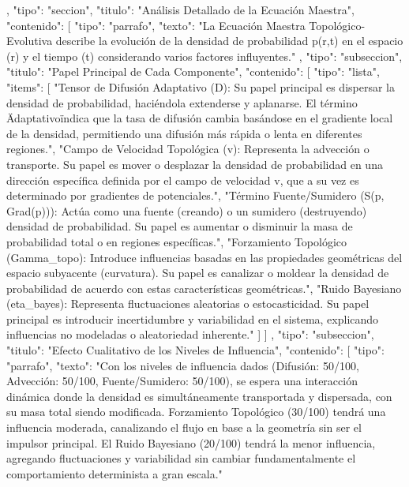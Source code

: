 \documentclass{article}
\begin{document}
{{    },
    {
      "tipo": "seccion",
      "titulo": "Análisis Detallado de la Ecuación Maestra",
      "contenido": [
        {
          "tipo": "parrafo",
          "texto": "La Ecuación Maestra Topológico-Evolutiva describe la evolución de la densidad de probabilidad p(r,t) en el espacio (r) y el tiempo (t) considerando varios factores influyentes."
        },
        {
          "tipo": "subseccion",
          "titulo": "Papel Principal de Cada Componente",
          "contenido": [
            {
              "tipo": "lista",
              "items": [
                "Tensor de Difusión Adaptativo (D): Su papel principal es dispersar la densidad de probabilidad, haciéndola extenderse y aplanarse. El término \"Adaptativo\" indica que la tasa de difusión cambia basándose en el gradiente local de la densidad, permitiendo una difusión más rápida o lenta en diferentes regiones.",
                "Campo de Velocidad Topológica (v): Representa la advección o transporte. Su papel es mover o desplazar la densidad de probabilidad en una dirección específica definida por el campo de velocidad v, que a su vez es determinado por gradientes de potenciales.",
                "Término Fuente/Sumidero (S(p, Grad(p))): Actúa como una fuente (creando) o un sumidero (destruyendo) densidad de probabilidad. Su papel es aumentar o disminuir la masa de probabilidad total o en regiones específicas.",
                "Forzamiento Topológico (Gamma_topo): Introduce influencias basadas en las propiedades geométricas del espacio subyacente (curvatura). Su papel es canalizar o moldear la densidad de probabilidad de acuerdo con estas características geométricas.",
                "Ruido Bayesiano (eta_bayes): Representa fluctuaciones aleatorias o estocasticidad. Su papel principal es introducir incertidumbre y variabilidad en el sistema, explicando influencias no modeladas o aleatoriedad inherente."
              ]
            }
          ]
        },
        {
          "tipo": "subseccion",
          "titulo": "Efecto Cualitativo de los Niveles de Influencia",
          "contenido": [
            {
              "tipo": "parrafo",
              "texto": "Con los niveles de influencia dados (Difusión: 50/100, Advección: 50/100, Fuente/Sumidero: 50/100), se espera una interacción dinámica donde la densidad es simultáneamente transportada y dispersada, con su masa total siendo modificada. Forzamiento Topológico (30/100) tendrá una influencia moderada, canalizando el flujo en base a la geometría sin ser el impulsor principal. El Ruido Bayesiano (20/100) tendrá la menor influencia, agregando fluctuaciones y variabilidad sin cambiar fundamentalmente el comportamiento determinista a gran escala."
}}}}
\end{document}
